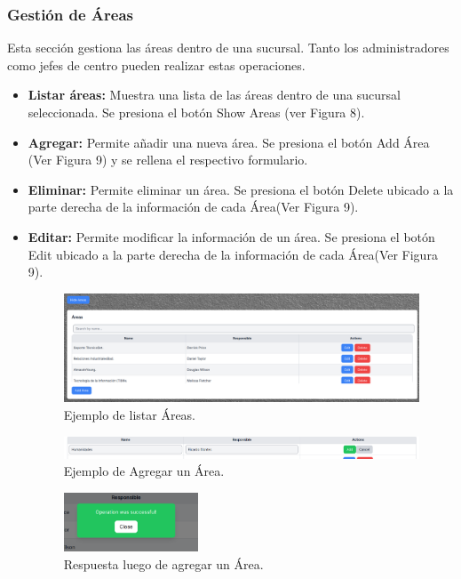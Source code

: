 \documentclass{article}
\begin{document}
\subsubsection{Gestión de Áreas}
Esta sección gestiona las áreas dentro de una sucursal. Tanto los administradores como jefes de centro pueden realizar estas operaciones.

\begin{itemize}
    \item \textbf{Listar áreas:} Muestra una lista de las áreas dentro de una sucursal seleccionada. Se presiona el botón Show Areas (ver Figura 8).
    \item \textbf{Agregar:} Permite añadir una nueva área. Se presiona el botón Add Área (Ver Figura 9) y se rellena el respectivo formulario.
    \item \textbf{Eliminar:} Permite eliminar un área. Se presiona el botón Delete ubicado a la parte derecha de la información de cada Área(Ver Figura 9).
    \item \textbf{Editar:} Permite modificar la información de un área. Se presiona el botón Edit ubicado a la parte derecha de la información de cada Área(Ver Figura 9).
    
    \begin{figure}[h!]
        \centering
        \includegraphics[width= 14cm]{list_area.png}
        \caption{Ejemplo de listar Áreas.}
    \end{figure}

    \begin{figure}[h!]
        \centering
        \includegraphics[width= 14cm]{add_area.png}
        \caption{Ejemplo de Agregar un Área.}
    \end{figure}

    \begin{figure}[h!]
        \centering
        \includegraphics[width= 4cm]{response.png}
        \caption{Respuesta luego de agregar un Área.}
    \end{figure}

\end{itemize}
\end{document}
